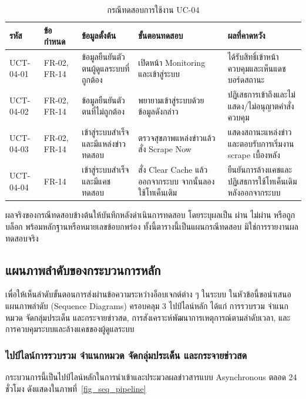 \begin{table}[H]
\centering
\caption{กรณีทดสอบการใช้งาน UC-04}
\label{tab_uct_uc04}

\begin{tabularx}{\textwidth}{|C{1.8cm}|C{1.2cm}|L{3.0cm}|Y|Y|}
\hline
\textbf{รหัส} & \textbf{ข้อกำหนด} & \textbf{ข้อมูลตั้งต้น} & \textbf{ขั้นตอนทดสอบ} & \textbf{ผลที่คาดหวัง} \\ \hline
UCT-04-01 & FR-02, FR-14 & ข้อมูลยืนยันตัวตนผู้ดูแลระบบที่ถูกต้อง & เปิดหน้า Monitoring และเข้าสู่ระบบ & ได้รับสิทธิ์เข้าหน้าควบคุมและเห็นแดชบอร์ดสถานะ \\ \hline
UCT-04-02 & FR-02, FR-14 & ข้อมูลยืนยันตัวตนที่ไม่ถูกต้อง & พยายามเข้าสู่ระบบด้วยข้อมูลดังกล่าว & ปฏิเสธการเข้าถึงและไม่แสดง/ไม่อนุญาตคำสั่งควบคุม \\ \hline
UCT-04-03 & FR-02, FR-14 & เข้าสู่ระบบสำเร็จและมีแหล่งข่าวทดสอบ & ตรวจสุขภาพแหล่งข่าวแล้วสั่ง Scrape Now & แสดงสถานะแหล่งข่าวและตอบรับการเริ่มงาน scrape เบื้องหลัง \\ \hline
UCT-04-04 & FR-14 & เข้าสู่ระบบสำเร็จและมีแคชทดสอบ & สั่ง Clear Cache แล้วออกจากระบบ จากนั้นลองใช้โทเค็นเดิม & ยืนยันการล้างแคชและปฏิเสธการใช้โทเค็นเดิมหลังออกจากระบบ \\ \hline
\end{tabularx}
\end{table}

ผลจริงของกรณีทดสอบข้างต้นให้บันทึกหลังดำเนินการทดสอบ โดยระบุผลเป็น ผ่าน ไม่ผ่าน หรือถูกบล็อก พร้อมหลักฐานหรือหมายเลขข้อบกพร่อง ทั้งนี้ตารางนี้เป็นแผนกรณีทดสอบ มิใช่การรายงานผลทดสอบจริง

\subsection{แผนภาพลำดับของกระบวนการหลัก}

เพื่อให้เห็นลำดับขั้นตอนการส่งผ่านข้อความระหว่างอ็อบเจกต์ต่าง ๆ ในระบบ ในหัวข้อนี้ขอนำเสนอแผนภาพลำดับ (Sequence Diagrams) ครอบคลุม 3 ไปป์ไลน์หลัก ได้แก่ การรวบรวม จำแนกหมวด จัดกลุ่มประเด็น และกระจายข่าวสด, การสังเคราะห์พัฒนาการเหตุการณ์ตามลำดับเวลา, และการควบคุมระบบและล้างแคชของผู้ดูแลระบบ

\subsubsection{ไปป์ไลน์การรวบรวม จำแนกหมวด จัดกลุ่มประเด็น และกระจายข่าวสด}

กระบวนการนี้เป็นไปป์ไลน์หลักในการนำเข้าและประมวลผลข่าวสารแบบ Asynchronous ตลอด 24 ชั่วโมง ดังแสดงในภาพที่~\ref{fig_seq_pipeline}

